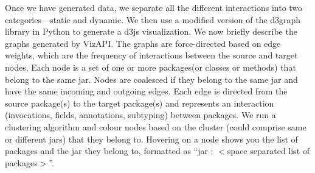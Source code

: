 \label{sec:vis-system}

Once we have generated data, we separate all the different interactions
into two categories---static and dynamic. We then use a modified version
of the d3graph  library in Python to generate a d3js  
visualization. We now briefly describe the graphs generated by VizAPI.
The graphs are force-directed based on edge weights, which are the
frequency of interactions between the source and target nodes.
Each node is a set of one or more packages(or classes or methods) 
that belong to the same jar. Nodes are coalesced if they belong to the same 
jar and have the same incoming and outgoing edges. Each edge is directed 
from the source package(s) to the target package(s) and represents an interaction 
(invocations, fields, annotations, subtyping) between packages. We run a 
clustering algorithm and colour nodes based on the cluster 
(could comprise same or different jars) that they belong to. 
Hovering on a node shows you the list of packages and 
the jar they belong to, 
formatted as “jar : $<$space separated list of packages$>$”.
